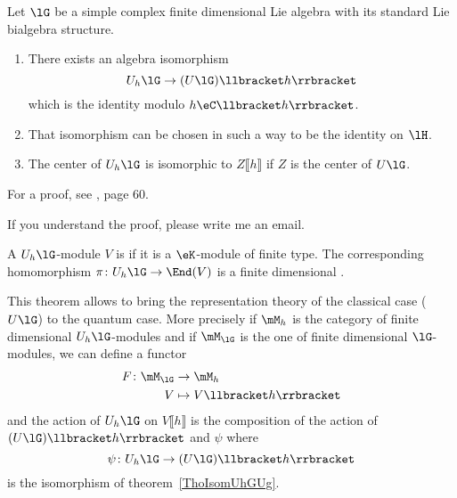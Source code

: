 \begin{theorem}     \label{ThoIsomUhGUg}
	Let \( \lG\) be a simple complex finite dimensional Lie algebra with its standard Lie bialgebra structure.
	\begin{enumerate}
		\item

		      There exists an algebra isomorphism
		      \begin{equation}
			      U_h\lG\to(U\lG)\llbracket h\rrbracket
		      \end{equation}
		      which is the identity modulo \( h\eC\llbracket h\rrbracket\).
		\item
		      That isomorphism can be chosen in such a way to be the identity on \( \lH\).
		\item
		      The center of \( U_h\lG\) is isomorphic to \( Z\llbracket h\rrbracket\) if \( Z\) is the center of \( U\lG\).
	\end{enumerate}

\end{theorem}

For a proof, see \cite{SoibelmanI}, page 60.

\begin{probleme}
	If you understand the proof, please write me an email.
\end{probleme}

A \( U_h\lG\)-module \( V\) is  if it is  a \( \eK\)-module of finite type. The corresponding homomorphism \( \pi\colon U_h\lG\to \End(V)\) is a finite dimensional .

This theorem allows to bring the representation theory of the classical case (\( U\lG\)) to the quantum case. More precisely if \( \mM_h\) is the category of finite dimensional \( U_h\lG\)-modules and if \( \mM_{\lG}\) is the one of finite dimensional \( \lG\)-modules, we can define a functor
\begin{equation}
	\begin{aligned}
		F\colon \mM_{\lG} & \to \mM_h                       \\
		V                 & \mapsto V\llbracket h\rrbracket
	\end{aligned}
\end{equation}
and the action of \( U_h\lG\) on \( V\llbracket h\rrbracket\) is the composition of the action of \( (U\lG)\llbracket h\rrbracket \) and \( \psi\) where
\begin{equation}
	\psi\colon U_h\lG\to (U\lG)\llbracket h\rrbracket
\end{equation}
is the isomorphism of theorem~\ref{ThoIsomUhGUg}.

